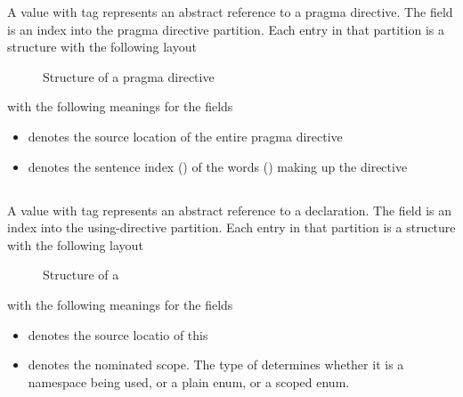 A  value with tag  represents an abstract reference to a pragma directive.
The  field is an index into the pragma directive partition.
Each entry in that partition is a structure with the following layout
%
\begin{figure}[H]
    \centering
    \caption{Structure of a pragma directive}
    \label{fig:ifc:DirSort:Pragma}
\end{figure}
%
with the following meanings for the fields
\begin{itemize}
    \item {} denotes the source location of the entire pragma directive
    \item {} denotes the sentence index () of the words () making up the directive
\end{itemize}


\subsection{}
\label{sec:ifc:DirSort:Using}

A  value with tag  represents an abstract reference to a  declaration.
The  field is an index into the using-directive partition.
Each entry in that partition is a structure with the following layout
%
\begin{figure}[H]
    \centering
    \caption{Structure of a }
    \label{fig:ifc:DirSort:Using}
\end{figure}
%
with the following meanings for the fields
\begin{itemize}
    \item {} denotes the source locatio of this 
    \item {} denotes the nominated scope.  The type of  determines whether it is a namespace being used, or a plain enum, or a scoped enum.
\end{itemize}
  
